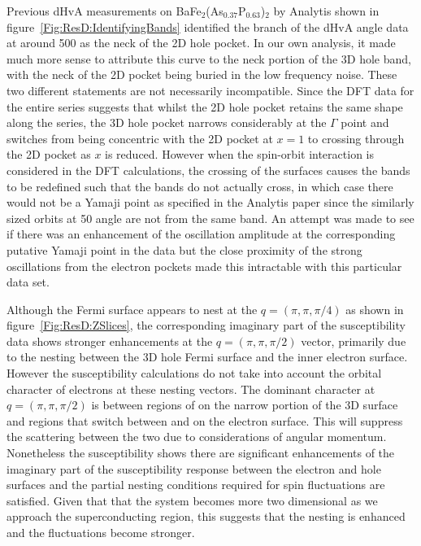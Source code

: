 Previous \ac{dHvA} measurements on BaFe$_2$(As$_{0.37}$P$_{0.63}$)$_2$ by Analytis \etal{} shown in figure~\ref{Fig:ResD:IdentifyingBands} identified the branch of the \ac{dHvA} angle data at around \unit{500}{\tesla} as the neck of the 2D hole pocket. In our own analysis, it made much more sense to attribute this curve to the neck portion of the 3D hole band, with the neck of the 2D pocket being buried in the low frequency noise. These two different statements are not necessarily incompatible. Since the \ac{DFT} data for the entire series suggests that whilst the 2D hole pocket retains the same shape along the \BaFeAsP{} series, the 3D hole pocket narrows considerably at the $\Gamma$ point and switches from being concentric with the 2D pocket at $x=1$ to crossing through the 2D pocket as $x$ is reduced. However when the spin-orbit interaction is considered in the \ac{DFT} calculations, the crossing of the surfaces causes the bands to be redefined such that the bands do not actually cross, in which case there would not be a Yamaji point as specified in the Analytis paper since the similarly sized orbits at \unit{50}{\degree} angle are not from the same band. An attempt was made to see if there was an enhancement of the oscillation amplitude at the corresponding putative Yamaji point in the \BaFeP{} data but the close proximity of the strong oscillations from the electron pockets made this intractable with this particular data set.

Although the Fermi surface appears to nest at the $q=(\pi, \pi, \pi/4)$ as shown in figure~\ref{Fig:ResD:ZSlices}, the corresponding imaginary part of the susceptibility data shows stronger enhancements at the $q=(\pi, \pi, \pi/2)$ vector, primarily due to the nesting between the 3D hole Fermi surface and the inner electron surface. However the susceptibility calculations do not take into account the orbital character of electrons at these nesting vectors. The dominant character at $q=(\pi, \pi, \pi/2)$ is between regions of \DxzDyz{} on the narrow portion of the 3D surface and regions that switch between \Dxy and \DxzDyz{} on the electron surface. This will suppress the scattering between the two due to considerations of angular momentum. Nonetheless the susceptibility shows there are significant enhancements of the imaginary part of the susceptibility response between the electron and hole surfaces and the partial nesting conditions required for spin fluctuations are satisfied. Given that that the system becomes more two dimensional as we approach the superconducting region, this suggests that the nesting is enhanced and the fluctuations become stronger.

